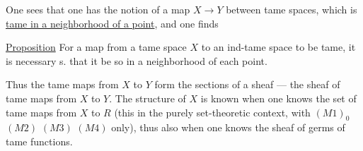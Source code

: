 One sees  that one has the notion of a map $X\longrightarrow Y$ between tame spaces, which is \uline{tame in a neighborhood of a point}, and one finds

\uline{Proposition} For a map from a tame space $X$ to an ind-tame space to be tame, it is necessary s. that it be so in a neighborhood of each point.

Thus the tame maps from $X$ to $Y$ form the sections of a sheaf --- the sheaf of tame maps from $X$ to $Y$. The  structure of $X$ is known when one knows the set of tame maps from $X$ to $R$ (this  in the purely set-theoretic context, with $(M1)_0$ $(M2)$ $(M3)$ $(M4)$ only), thus also when one knows the sheaf of germs of tame functions.
